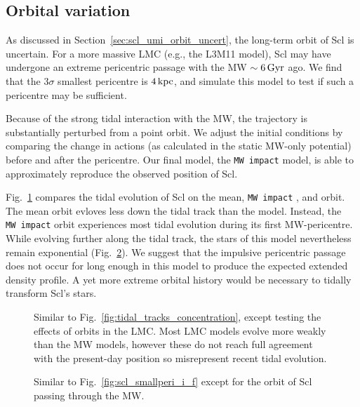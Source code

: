 \subsection{Orbital variation}\label{orbital-variation}

As discussed in Section~\ref{sec:scl_umi_orbit_uncert}, the long-term
orbit of Scl is uncertain. For a more massive LMC (e.g., the L3M11
model), Scl may have undergone an extreme pericentric passage with the
MW \(\sim 6\,{\rm Gyr}\) ago. We find that the 3\(\sigma\) smallest
pericentre is \(4\,{\rm kpc}\), and simulate this model to test if such a
pericentre may be sufficient.

Because of the strong tidal interaction with the MW, the trajectory is
substantially perturbed from a point orbit. We adjust the initial
conditions by comparing the change in actions (as calculated in the
static MW-only potential) before and after the pericentre. Our final
model, the \texttt{MW\ impact} model, is able to approximately reproduce
the observed position of Scl.

Fig.~\ref{fig:tidal_tracks_umi} compares the tidal evolution of Scl on
the mean, \texttt{MW\ impact} , and \smallperi{} orbit. The mean orbit
evloves less down the tidal track than the \smallperi{} model. Instead,
the \texttt{MW\ impact} orbit experiences most tidal evolution during
its first MW-pericentre. While evolving further along the tidal track,
the stars of this model nevertheless remain exponential
(Fig.~\ref{fig:scl_mw_impact_i_f}). We suggest that the impulsive
pericentric passage does not occur for long enough in this model to
produce the expected extended density profile. A yet more extreme
orbital history would be necessary to tidally transform Scl's stars.

\begin{figure}
\centering
{}
\caption[Ursa Minor tidal dependence on orbit]{Similar to
Fig.~\ref{fig:tidal_tracks_concentration}, except testing the effects of
orbits in the LMC. Most LMC models evolve more weakly than the MW
models, however these do not reach full agreement with the present-day
position so misrepresent recent tidal
evolution.}\label{fig:tidal_tracks_umi}
\end{figure}

\begin{figure}
\centering
{}
\caption[Sculptor MW-impact density profiles]{Similar to
Fig.~\ref{fig:scl_smallperi_i_f} except for the orbit of Scl passing
through the MW.}\label{fig:scl_mw_impact_i_f}
\end{figure}


